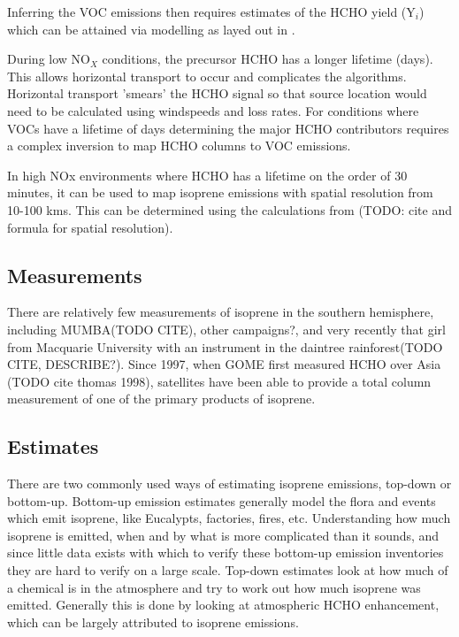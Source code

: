     Inferring the VOC emissions then requires estimates of the HCHO yield (Y$_i$) which can be attained via modelling as layed out in \citet{Millet_2006}.

    During low NO$_X$ conditions, the precursor HCHO has a longer lifetime (days).
    This allows horizontal transport to occur and complicates the algorithms.
    Horizontal transport 'smears' the HCHO signal so that source location would need to be calculated using windspeeds and loss rates.
    For conditions where VOCs have a lifetime of days determining the major HCHO contributors requires a complex inversion to map HCHO columns to VOC emissions.

    In high NOx environments where HCHO has a lifetime on the order of 30 minutes, it can be used to map isoprene emissions with spatial resolution from 10-100 kms.
    This can be determined using the calculations from (TODO: cite and formula for spatial resolution).

  \subsection{Measurements}
  
    There are relatively few measurements of isoprene in the southern hemisphere, including MUMBA(TODO CITE), other campaigns?, and very recently that girl from Macquarie University with an instrument in the daintree rainforest(TODO CITE, DESCRIBE?).
    Since 1997, when GOME first measured HCHO over Asia (TODO cite thomas 1998), satellites have been able to provide a total column measurement of one of the primary products of isoprene.
  
  \subsection{Estimates}
    There are two commonly used ways of estimating isoprene emissions, top-down or bottom-up.
    Bottom-up emission estimates generally model the flora and events which emit isoprene, like Eucalypts, factories, fires, etc.
    Understanding how much isoprene is emitted, when and by what is more complicated than it sounds, and since little data exists with which to verify these bottom-up emission inventories they are hard to verify on a large scale.
    Top-down estimates look at how much of a chemical is in the atmosphere and try to work out how much isoprene was emitted. Generally this is done by looking at atmospheric HCHO enhancement, which can be largely attributed to isoprene emissions.
  
